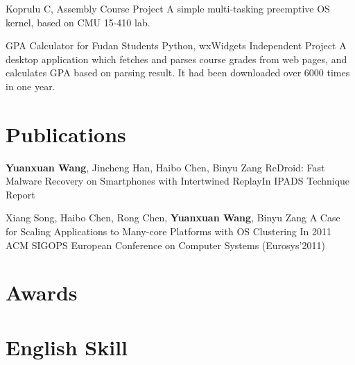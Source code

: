 \documentclass[11pt,a4paper]{moderncv}
\begin{document}
\vspace*{0.2\baselineskip}
{Koprulu}
{C, Assembly}
{Course Project}{}
{
A simple multi-tasking preemptive OS kernel, based on CMU 15-410 lab.
}

\vspace*{0.2\baselineskip}
{GPA Calculator for Fudan Students}
{Python, wxWidgets}
{Independent Project}{}
{
A desktop application which fetches and parses course grades from web
pages, and calculates GPA based on parsing result. It had been
downloaded over 6000 times in one year.
}

\section{Publications}

{\textbf{Yuanxuan Wang}\textnormal{, Jincheng Han, Haibo Chen, Binyu Zang}}
{ReDroid: Fast Malware Recovery on Smartphones with Intertwined Replay}{In IPADS Technique Report}
{}{}{}

{\textnormal{Xiang Song, Haibo Chen, Rong Chen,} \textbf{Yuanxuan Wang}\textnormal{, Binyu Zang}}
{A Case for Scaling Applications to Many-core Platforms with OS Clustering}
{In 2011 ACM SIGOPS European Conference on Computer Systems (Eurosys'2011)}
{}{}{}

\section{Awards}


\section{English Skill}



\end{document}
